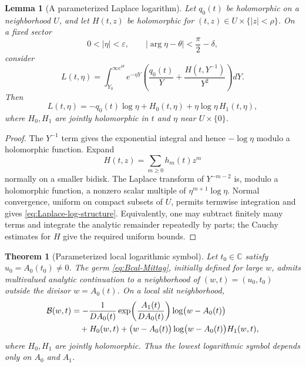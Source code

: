 \documentclass[11pt]{article}
\numberwithin{equation}{section}
\newtheorem{theorem}{Theorem}[section]
\newtheorem{lemma}[lemma]{Lemma}
\theoremstyle{definition}
\theoremstyle{remark}
\newcommand{\C}{\mathbb C}
\newcommand{\Bcal}{\mathcal B}
\newcommand{\eps}{\varepsilon}
\begin{document}
\begin{lemma}[A parameterized Laplace logarithm]\label{lem:parameter-Laplace-log}
Let $q_0(t)$ be holomorphic on a neighborhood $U$, and let $H(t,z)$ be holomorphic for $(t,z)\in U\times\{|z|<\rho\}$.  On a fixed sector
\[
  0<|\eta|<\eps,
  \qquad
  |\arg\eta-\theta|<\frac\pi2-\delta,
\]
consider
\[
  L(t,\eta)=\int_{Y_0}^{\infty e^{i\theta}}
  e^{-\eta Y}\left(\frac{q_0(t)}Y+\frac{H(t,Y^{-1})}{Y^2}\right)dY.
\]
Then
\begin{equation}\label{eq:Laplace-log-structure}
  L(t,\eta)=-q_0(t)\log\eta+H_0(t,\eta)
  +\eta\log\eta\,H_1(t,\eta),
\end{equation}
where $H_0,H_1$ are jointly holomorphic in $t$ and $\eta$ near $U\times\{0\}$.
\end{lemma}

\begin{proof}
The $Y^{-1}$ term gives the exponential integral and hence $-\log\eta$ modulo a holomorphic function.  Expand
\[
  H(t,z)=\sum_{m\ge0}h_m(t)z^m
\]
normally on a smaller bidisk.  The Laplace transform of $Y^{-m-2}$ is, modulo a holomorphic function, a nonzero scalar multiple of $\eta^{m+1}\log\eta$.  Normal convergence, uniform on compact subsets of $U$, permits termwise integration and gives \eqref{eq:Laplace-log-structure}.  Equivalently, one may subtract finitely many terms and integrate the analytic remainder repeatedly by parts; the Cauchy estimates for $H$ give the required uniform bounds.
\end{proof}

\begin{theorem}[Parameterized local logarithmic symbol]\label{thm:boundary-symbol}
Let $t_0\in\C$ satisfy $u_0=A_0(t_0)\neq0$.  The germ \eqref{eq:Bcal-Mittag}, initially defined for large $w$, admits multivalued analytic continuation to a neighborhood of $(w,t)=(u_0,t_0)$ outside the divisor $w=A_0(t)$.  On a local slit neighborhood,
\begin{align}\label{eq:boundary-symbol}
  \Bcal(w,t)
  &=-\frac1{DA_0(t)}
  \exp\!\left(\frac{A_1(t)}{DA_0(t)}\right)
  \log\bigl(w-A_0(t)\bigr)\notag\\
  &\quad+H_0(w,t)
  +\bigl(w-A_0(t)\bigr)
   \log\bigl(w-A_0(t)\bigr)H_1(w,t),
\end{align}
where $H_0,H_1$ are jointly holomorphic.  Thus the lowest logarithmic symbol depends only on $A_0$ and $A_1$.
\end{theorem}
\end{document}
